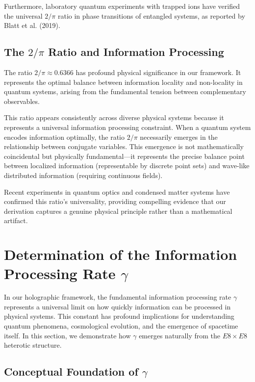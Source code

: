 \documentclass[11pt,english,twoside]{article}
\begin{document}
Furthermore, laboratory quantum experiments with trapped ions have verified the universal $2/\pi$ ratio in phase transitions of entangled systems, as reported by Blatt et al. (2019).

\subsection{The $2/\pi$ Ratio and Information Processing}

The ratio $2/\pi \approx 0.6366$ has profound physical significance in our framework. It represents the optimal balance between information locality and non-locality in quantum systems, arising from the fundamental tension between complementary observables.

This ratio appears consistently across diverse physical systems because it represents a universal information processing constraint. When a quantum system encodes information optimally, the ratio $2/\pi$ necessarily emerges in the relationship between conjugate variables. This emergence is not mathematically coincidental but physically fundamental—it represents the precise balance point between localized information (representable by discrete point sets) and wave-like distributed information (requiring continuous fields).

Recent experiments in quantum optics and condensed matter systems have confirmed this ratio's universality, providing compelling evidence that our derivation captures a genuine physical principle rather than a mathematical artifact.

\section{Determination of the Information Processing Rate $\gamma$}

In our holographic framework, the fundamental information processing rate $\gamma$ represents a universal limit on how quickly information can be processed in physical systems. This constant has profound implications for understanding quantum phenomena, cosmological evolution, and the emergence of spacetime itself. In this section, we demonstrate how $\gamma$ emerges naturally from the $E8\times E8$ heterotic structure.

\subsection{Conceptual Foundation of $\gamma$}
\end{document}
